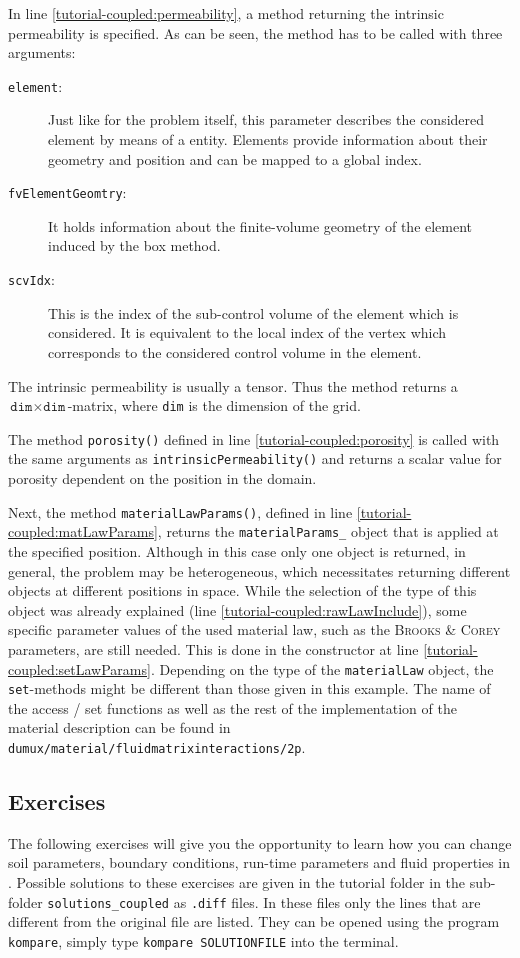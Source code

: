 In line \ref{tutorial-coupled:permeability}, a method returning the
intrinsic permeability is specified. As can be seen, the method has
to be called with three arguments:
\begin{description}
\item[\texttt{element}:] Just like for the problem itself, this
  parameter describes the considered element by means of a \Dune
  entity. Elements provide information about their geometry and
  position and can be mapped to a global index.
\item[\texttt{fvElementGeomtry}:] It holds information about the finite-volume
  geometry of the element induced by the box method.
\item[\texttt{scvIdx}:] This is the index of the sub-control volume of the
  element which is considered. It is equivalent to the local index
  of the vertex which corresponds to the considered control volume in
  the element.
\end{description}

The intrinsic permeability is usually a tensor. Thus the method returns
a $\texttt{dim} \times \texttt{dim}$-matrix, where \texttt{dim} is the
dimension of the grid.

The method \texttt{porosity()} defined in line
\ref{tutorial-coupled:porosity} is called with the same arguments as
\texttt{intrinsicPermeability()} and returns a scalar value for
porosity dependent on the position in the domain.

Next, the method \texttt{materialLawParams()}, defined in line
\ref{tutorial-coupled:matLawParams}, returns the
\verb+materialParams_+ object that is applied at the specified
position. Although in this case only one object is returned, in
general, the problem may be heterogeneous, which necessitates
returning different objects at different positions in space.  While
the selection of the type of this object was already explained (line
\ref{tutorial-coupled:rawLawInclude}), some specific parameter values
of the used material law, such as the \textsc{Brooks} \&
\textsc{Corey} parameters, are still needed. This is done in the
constructor at line \ref{tutorial-coupled:setLawParams}.  Depending on
the type of the \texttt{materialLaw} object, the \texttt{set}-methods
might be different than those given in this example. The name of the
access / set functions as well as the rest of the implementation of
the material description can be found in
\verb+dumux/material/fluidmatrixinteractions/2p+.

\subsection{Exercises}
\label{tutorial-coupled:exercises}
The following exercises will give you the opportunity to learn how you
can change soil parameters, boundary conditions, run-time parameters
and fluid properties in \Dumux. Possible solutions to these exercises are given in the tutorial folder in the
sub-folder \texttt{solutions\_coupled} as \texttt{.diff} files. In these files only the lines that are different from the original file are listed. 
They can be opened using the program \texttt{kompare}, simply type \texttt{kompare SOLUTIONFILE} into the terminal.

